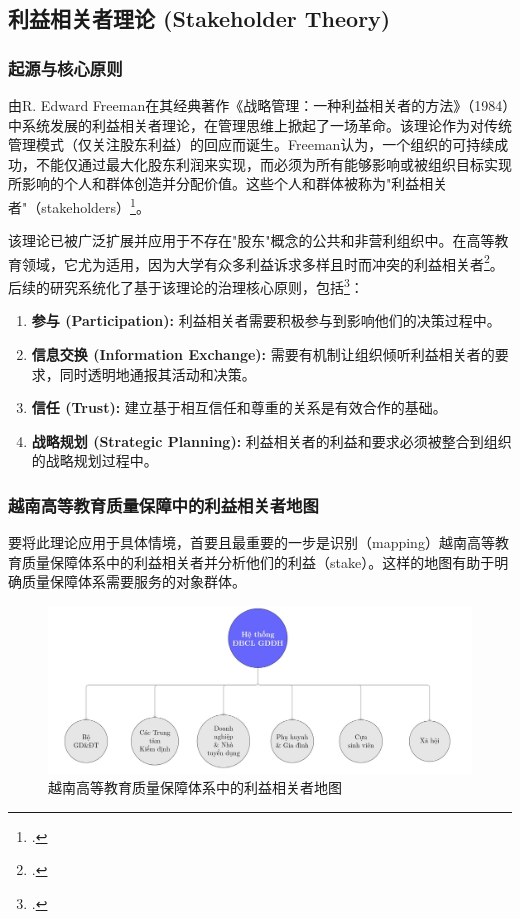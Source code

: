 \subsection{利益相关者理论 (Stakeholder Theory)}
\label{subsec:ben_lien_quan_nen_tang}

\subsubsection{起源与核心原则}

由R. Edward Freeman在其经典著作《战略管理：一种利益相关者的方法》（1984）中系统发展的利益相关者理论，在管理思维上掀起了一场革命。该理论作为对传统管理模式（仅关注股东利益）的回应而诞生。Freeman认为，一个组织的可持续成功，不能仅通过最大化股东利润来实现，而必须为所有能够影响或被组织目标实现所影响的个人和群体创造并分配价值。这些个人和群体被称为"利益相关者"（stakeholders）\footcite{Freeman1984}。

该理论已被广泛扩展并应用于不存在"股东"概念的公共和非营利组织中。在高等教育领域，它尤为适用，因为大学有众多利益诉求多样且时而冲突的利益相关者\footcite{Langrafe2020}。后续的研究系统化了基于该理论的治理核心原则，包括\footcite{LangrafeEUR2020}：
\begin{enumerate}
    \item \textbf{参与 (Participation):} 利益相关者需要积极参与到影响他们的决策过程中。
    \item \textbf{信息交换 (Information Exchange):} 需要有机制让组织倾听利益相关者的要求，同时透明地通报其活动和决策。
    \item \textbf{信任 (Trust):} 建立基于相互信任和尊重的关系是有效合作的基础。
    \item \textbf{战略规划 (Strategic Planning):} 利益相关者的利益和要求必须被整合到组织的战略规划过程中。
\end{enumerate}

\subsubsection{越南高等教育质量保障中的利益相关者地图}

要将此理论应用于具体情境，首要且最重要的一步是识别（mapping）越南高等教育质量保障体系中的利益相关者并分析他们的利益（stake）。这样的地图有助于明确质量保障体系需要服务的对象群体。
\begin{figure}[h!]
    \centering
    \includegraphics[width=\textwidth]{image/stakeholder_map.jpg} 
    \caption{越南高等教育质量保障体系中的利益相关者地图}
    \label{fig:stakeholder-map}
\end{figure}

